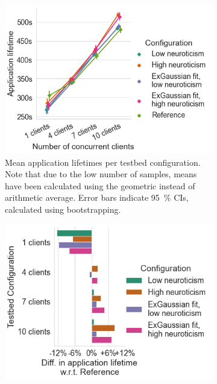 \begin{figure}
    \centering
    \begin{subfigure}[t]{.45\textwidth}
        \centering
        \includegraphics[width=\textwidth]{figs/new_model/lifetime_testbed}
        \caption{%
            Mean application lifetimes per testbed configuration.
            Note that due to the low number of samples, means have been calculated using the geometric instead of arithmetic average. 
            Error bars indicate \SI{95}{\percent} \glspl{CI}, calculated using bootstrapping.
        }
    \end{subfigure}%
    \hfill%
    \begin{subfigure}[t]{.45\textwidth}
        \centering
        \includegraphics[width=\textwidth]{figs/new_model/lifetime_testbed_diff}

\end{subfigure}
\end{figure}
